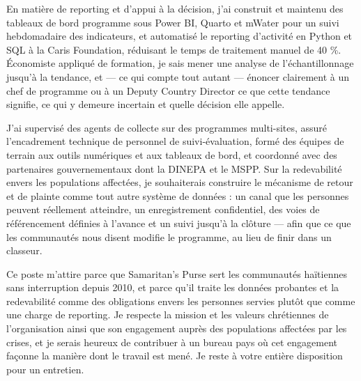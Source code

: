 \documentclass[11pt,a4paper,sans]{moderncv}
\begin{document}
En matière de reporting et d'appui à la décision, j'ai construit et maintenu des tableaux de bord programme sous Power BI, Quarto et mWater pour un suivi hebdomadaire des indicateurs, et automatisé le reporting d'activité en Python et SQL à la Caris Foundation, réduisant le temps de traitement manuel de 40 \%. Économiste appliqué de formation, je sais mener une analyse de l'échantillonnage jusqu'à la tendance, et --- ce qui compte tout autant --- énoncer clairement à un chef de programme ou à un Deputy Country Director ce que cette tendance signifie, ce qui y demeure incertain et quelle décision elle appelle.

J'ai supervisé des agents de collecte sur des programmes multi-sites, assuré l'encadrement technique de personnel de suivi-évaluation, formé des équipes de terrain aux outils numériques et aux tableaux de bord, et coordonné avec des partenaires gouvernementaux dont la DINEPA et le MSPP. Sur la redevabilité envers les populations affectées, je souhaiterais construire le mécanisme de retour et de plainte comme tout autre système de données : un canal que les personnes peuvent réellement atteindre, un enregistrement confidentiel, des voies de référencement définies à l'avance et un suivi jusqu'à la clôture --- afin que ce que les communautés nous disent modifie le programme, au lieu de finir dans un classeur.

Ce poste m'attire parce que Samaritan's Purse sert les communautés haïtiennes sans interruption depuis 2010, et parce qu'il traite les données probantes et la redevabilité comme des obligations envers les personnes servies plutôt que comme une charge de reporting. Je respecte la mission et les valeurs chrétiennes de l'organisation ainsi que son engagement auprès des populations affectées par les crises, et je serais heureux de contribuer à un bureau pays où cet engagement façonne la manière dont le travail est mené. Je reste à votre entière disposition pour un entretien.

\makeletterclosing
\end{document}
